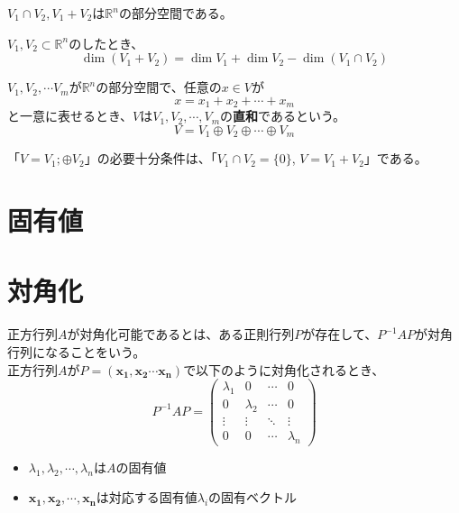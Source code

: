 \documentclass{jlreq}
\begin{document}
\begin{theorembox}
  $V_1 \cap V_2, V_1 + V_2$は$\mathbb{R}^n$の部分空間である。
\end{theorembox}

\begin{theorembox}[和空間の次元]
  $V_1, V_2 \subset \mathbb{R}^n$のしたとき、
  \begin{equation*}
    \dim (V_1 + V_2) = \dim V_1 + \dim V_2 - \dim (V_1 \cap V_2)
  \end{equation*}
\end{theorembox}

\begin{definitionbox}[直和]
  $V_1, V_2, \cdots V_m$が$\mathbb{R}^n$の部分空間で、任意の$x \in V$が
  \begin{equation*}
    x = x_1 + x_2 + \cdots + x_m 
  \end{equation*}
  と一意に表せるとき、$V$は$V_1, V_2, \cdots, V_m$の\textbf{直和}であるという。
  \begin{equation*}
    V = V_1 \oplus V_2 \oplus \cdots \oplus V_m
  \end{equation*}
\end{definitionbox}

\begin{theorembox}
  「$V = V_1 ; \oplus V_2$」の必要十分条件は、「$V_1 \cap V_2 = \{0\}$, $V = V_1 + V_2$」である。
\end{theorembox}

\section{固有値}


\section{対角化}
\begin{tcolorbox}[enhanced,title=定義1 行列の対角化, 
  attach boxed title to top left, 
  colback=white!95!blue,
  colbacktitle=white!10!blue!50!black,
  drop fuzzy shadow,
  boxrule=0.25mm,
  ]
  正方行列$A$が対角化可能であるとは、ある正則行列$P$が存在して、$P^{-1}AP$が対角行列になることをいう。 \\
  正方行列$A$が$P = (\boldsymbol{x_1}, \boldsymbol{x_2} \cdots \boldsymbol{x_n})$で以下のように対角化されるとき、
  \begin{equation*}
    P^{-1}AP = \begin{pmatrix}
      \lambda_1 & 0 & \cdots & 0 \\
      0 & \lambda_2 & \cdots & 0 \\
      \vdots & \vdots & \ddots & \vdots \\
      0 & 0 & \cdots & \lambda_n
  \end{pmatrix}
  \end{equation*}
  \begin{itemize}
    \item $\lambda_1, \lambda_2, \cdots, \lambda_n$は$A$の固有値
    \item $\boldsymbol{x_1}, \boldsymbol{x_2}, \cdots, \boldsymbol{x_n}$は対応する固有値$\lambda_i$の固有ベクトル
  \end{itemize}
\end{tcolorbox}
\end{document}
